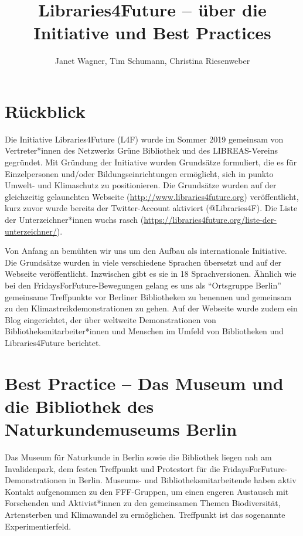 \documentclass[a4paper,
fontsize=11pt,
oneside,
numbers=noperiodatend,
parskip=half-,
bibliography=totoc,
final
]{scrartcl}
\title{\LARGE{Libraries4Future -- über die Initiative und Best Practices}}%
\author{Janet Wagner, Tim Schumann, Christina Riesenweber} %
\date{}
\begin{document}
\maketitle
\thispagestyle{fancyplain} 


\hypertarget{ruxfcckblick}{%
\section{Rückblick}\label{ruxfcckblick}}

Die Initiative Libraries4Future (L4F) wurde im Sommer 2019 gemeinsam von
Vertreter*innen des Netzwerks Grüne Bibliothek und des LIBREAS-Vereins
gegründet. Mit Gründung der Initiative wurden Grundsätze formuliert, die
es für Einzelpersonen und/oder Bildungseinrichtungen ermöglicht, sich in
punkto Umwelt- und Klimaschutz zu positionieren. Die Grundsätze wurden
auf der gleichzeitig gelaunchten Webseite
(\url{http://www.libraries4future.org}) veröffentlicht, kurz zuvor wurde
bereits der Twitter-Account aktiviert (@Libraries4F). Die Liste der
Unterzeichner*innen wuchs rasch
(\url{https://libraries4future.org/liste-der-unterzeichner/}).

Von Anfang an bemühten wir uns um den Aufbau als internationale
Initiative. Die Grundsätze wurden in viele verschiedene Sprachen
übersetzt und auf der Webseite veröffentlicht. Inzwischen gibt es sie in
18 Sprachversionen. Ähnlich wie bei den FridaysForFuture-Bewegungen
gelang es uns als \enquote{Ortsgruppe Berlin} gemeinsame Treffpunkte vor
Berliner Bibliotheken zu benennen und gemeinsam zu den
Klimastreikdemonstrationen zu gehen. Auf der Webseite wurde zudem ein
Blog eingerichtet, der über weltweite Demonstrationen von
Bibliotheksmitarbeiter*innen und Menschen im Umfeld von Bibliotheken und
Libraries4Future berichtet.

\hypertarget{best-practice-das-museum-und-die-bibliothek-des-naturkundemuseums-berlin}{%
\section{Best Practice -- Das Museum und die Bibliothek des
Naturkundemuseums
Berlin}\label{best-practice-das-museum-und-die-bibliothek-des-naturkundemuseums-berlin}}

Das Museum für Naturkunde in Berlin sowie die Bibliothek liegen nah am
Invalidenpark, dem festen Treffpunkt und Protestort für die
FridaysForFuture-Demonstrationen in Berlin. Museums- und
Bibliotheksmitarbeitende haben aktiv Kontakt aufgenommen zu den
FFF-Gruppen, um einen engeren Austausch mit Forschenden und
Aktivist*innen zu den gemeinsamen Themen Biodiversität, Artensterben und
Klimawandel zu ermöglichen. Treffpunkt ist das sogenannte
Experimentierfeld.
\end{document}
